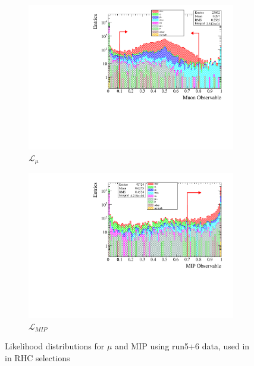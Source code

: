 \begin{figure}[!h]
	\begin{subfigure}[t]{0.49\textwidth}
		\includegraphics[width=\textwidth]{figures/numu/Cuts/numu_in_numubar/MuonLikelihood_prod6B_NuMuCont_FGD1Only}
		\caption{$\mathcal{L}_\mu$}
	\end{subfigure}
	\begin{subfigure}[t]{0.49\textwidth}
		\includegraphics[width=\textwidth]{figures/numu/Cuts/numu_in_numubar/MipLikelihood_LogScale}
		\caption{$\mathcal{L}_{MIP}$}
	\end{subfigure}
	\caption{Likelihood distributions for $\mu$ and MIP using run5+6 \numubar data, used in \numu in RHC selections}
	\label{fig:nu_numubar_likelihood}
\end{figure}

